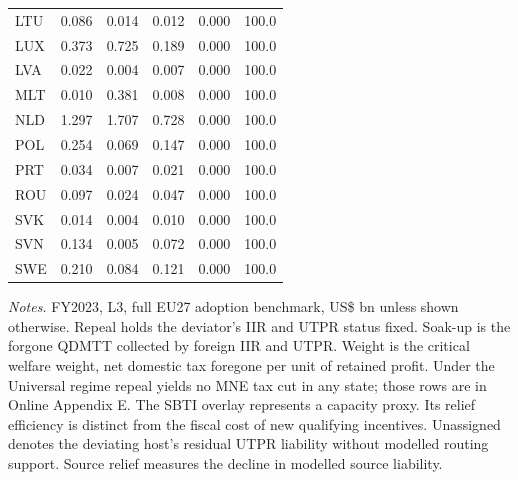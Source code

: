 \begin{table}[htbp]
\begin{tabular}{@{}lrrrrr@{}}
LTU & 0.086 & 0.014 & 0.012 & 0.000 & 100.0 \\
LUX & 0.373 & 0.725 & 0.189 & 0.000 & 100.0 \\
LVA & 0.022 & 0.004 & 0.007 & 0.000 & 100.0 \\
MLT & 0.010 & 0.381 & 0.008 & 0.000 & 100.0 \\
NLD & 1.297 & 1.707 & 0.728 & 0.000 & 100.0 \\
POL & 0.254 & 0.069 & 0.147 & 0.000 & 100.0 \\
PRT & 0.034 & 0.007 & 0.021 & 0.000 & 100.0 \\
ROU & 0.097 & 0.024 & 0.047 & 0.000 & 100.0 \\
SVK & 0.014 & 0.004 & 0.010 & 0.000 & 100.0 \\
SVN & 0.134 & 0.005 & 0.072 & 0.000 & 100.0 \\
SWE & 0.210 & 0.084 & 0.121 & 0.000 & 100.0 \\
\bottomrule
\end{tabular}
\par\vspace{0.6em}
\begin{minipage}{\textwidth}\footnotesize\raggedright\textit{Notes.} FY2023, L3, full EU27 adoption benchmark, US\$ bn unless shown otherwise. Repeal holds the deviator's IIR and UTPR status fixed. Soak-up is the forgone QDMTT collected by foreign IIR and UTPR. Weight is the critical welfare weight, net domestic tax foregone per unit of retained profit. Under the Universal regime repeal yields no MNE tax cut in any state; those rows are in Online Appendix E. The SBTI overlay represents a capacity proxy. Its relief efficiency is distinct from the fiscal cost of new qualifying incentives. Unassigned denotes the deviating host's residual UTPR liability without modelled routing support. Source relief measures the decline in modelled source liability.\end{minipage}
\end{table}
